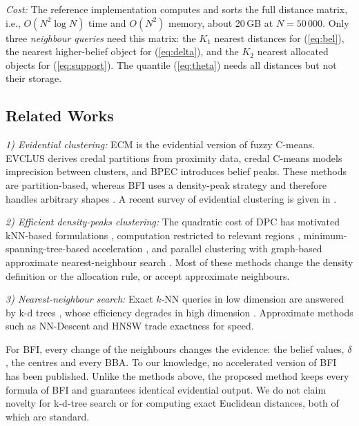 \documentclass[journal]{IEEEtran}
\begin{document}
\emph{Cost:} The reference implementation computes and sorts the full distance matrix, i.e., $O(N^2\log N)$ time and $O(N^2)$ memory, about 20\,GB at $N=50\,000$. Only three \emph{neighbour queries} need this matrix: the $K_1$ nearest distances for (\ref{eq:bel}), the nearest higher-belief object for (\ref{eq:delta}), and the $K_2$ nearest allocated objects for (\ref{eq:support}). The quantile (\ref{eq:theta}) needs all distances but not their storage.

\subsection{Related Works}
\emph{1) Evidential clustering:} ECM \cite{masson2008} is the evidential version of fuzzy C-means. EVCLUS \cite{denoeux2004} derives credal partitions from proximity data, credal C-means \cite{liu2015} models imprecision between clusters, and BPEC \cite{su2019} introduces belief peaks. These methods are partition-based, whereas BFI uses a density-peak strategy and therefore handles arbitrary shapes \cite{zhang2025}. A recent survey of evidential clustering is given in \cite{zhang2025survey}.

\emph{2) Efficient density-peaks clustering:} The quadratic cost of DPC \cite{rodriguez2014} has motivated kNN-based formulations \cite{du2016, xie2016}, computation restricted to relevant regions \cite{guan2024}, minimum-spanning-tree-based acceleration \cite{qiu2023}, and parallel clustering with graph-based approximate nearest-neighbour search \cite{yu2026}. Most of these methods change the density definition or the allocation rule, or accept approximate neighbours.

\emph{3) Nearest-neighbour search:} Exact $k$-NN queries in low dimension are answered by k-d trees \cite{bentley1975, friedman1977}, whose efficiency degrades in high dimension \cite{weber1998}. Approximate methods such as NN-Descent \cite{dong2011} and HNSW \cite{malkov2020} trade exactness for speed.

For BFI, every change of the neighbours changes the evidence: the belief values, $\delta$, the centres and every BBA. To our knowledge, no accelerated version of BFI has been published. Unlike the methods above, the proposed method keeps every formula of BFI and guarantees identical evidential output. We do not claim novelty for k-d-tree search or for computing exact Euclidean distances, both of which are standard.

\end{document}
